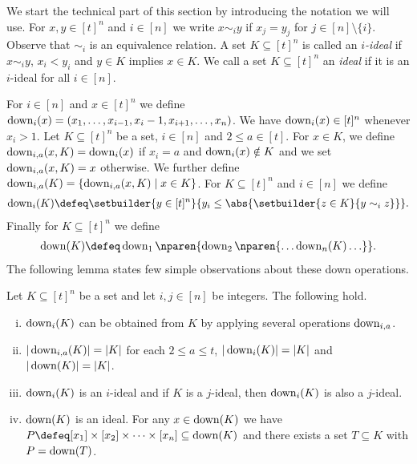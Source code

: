 We start the technical part of this section by introducing the
notation we will use. For $x,y\in[t]^n$ and $i\in[n]$ we write
$x\sim_iy$ if $x_j=y_j$ for $j\in[n]\setminus\{i\}$. Observe
that $\sim_i$ is an equivalence relation. A set $K\subseteq
[t]^n$ is called an {\em $i$-ideal} if $x\sim_i y$, $x_i<y_i$
and $y\in K$ implies $x\in K$. We call a set $K\subseteq[t]^n$
an {\em ideal} if it is an $i$-ideal for all $i\in[n]$.

For $i\in[n]$ and $x\in[t]^n$ we define
$\operatorname{down}_{i}(x)=(x_1,\ldots,x_{i-1},x_i-1,x_{i+1},\ldots,x_n)$. 
We have $\operatorname{down}_i(x)\in[t]^n$ whenever $x_i>1$.
%
Let $K\subseteq [t]^n$ be a set, $i\in[n]$ and $2\le a\in[t]$. 
For $x\in K$, we define $\operatorname{down}_{i,a}(x,K)=\operatorname{down}_i(x)$ if 
$x_i=a$ and $\operatorname{down}_i(x)\notin K$ and we set 
$\operatorname{down}_{i,a}(x,K)=x$ otherwise. We further define
$\operatorname{down}_{i,a}(K)=\{\operatorname{down}_{i,a}(x,K)\mid x\in K\}$.
For $K\subseteq[t]^n$ and $i\in[n]$ we define
\begin{align*}
\down_i(K)\defeq\setbuilder{y\in[t]^n}{y_i\le\abs{\setbuilder{z\in K}{y\sim_iz}}}.
\end{align*}
Finally for $K\subseteq[t]^n$ we define
\begin{align*}
\down(K)\defeq\down_1\nparen{\down_2\nparen{\ldots\down_n(K)\ldots}}.
\end{align*}
The following lemma states few simple observations about these
down operations.
\begin{lemma}
\label{lem:down}
Let $K\subseteq[t]^n$ be a set and let $i,j\in[n]$ be integers. 
The following hold.
\begin{enumerate}[(i)]
\item $\operatorname{down}_i(K)$ can be obtained from $K$ by applying several
  operations $\operatorname{down}_{i,a}$.
\item $|\operatorname{down}_{i,a}(K)|=|K|$ for each $2\le a\le t$, 
$|\operatorname{down}_i(K)|=|K|$ and $|\operatorname{down}(K)|=|K|$.
\item $\operatorname{down}_i(K)$ is an $i$-ideal and
if $K$ is a $j$-ideal, then $\operatorname{down}_i(K)$ is also a $j$-ideal.
\item $\operatorname{down}(K)$ is an ideal. For any $x\in\operatorname{down}(K)$ we have 
$P\defeq[x_1]\times[x_2]\times\cdots\times[x_n]
\subseteq\down(K)$ and there exists a set $T\subseteq K$ with
$P= \operatorname{down}(T)$.
\end{enumerate}
\end{lemma}
